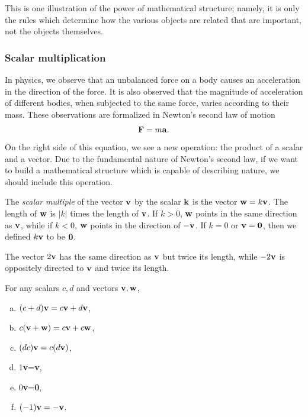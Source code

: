 \documentclass[12pt,letterpaper,reqno]{article}
\numberwithin{equation}{section}
\newcommand{\ti}[1]{\textit{#1}}
\begin{document}
This is one illustration of the power of mathematical structure; namely, it is only the rules which determine how the various objects are related that are important, not the objects themselves.

\subsubsection{Scalar multiplication}
In physics, we observe that an unbalanced force on a body causes an acceleration in the direction of the force. It is also observed that the magnitude of acceleration of different bodies, when subjected to the same force, varies according to their mass. These observations are formalized in Newton's second law of motion
\begin{equation}
	{\bf F}=m{\bf a}.
\end{equation}
On the right side of this equation, we see a new operation: the product of a scalar and a vector. Due to the fundamental nature of Newton's second law, if we want to build a mathematical structure which is capable of describing nature, we should include this operation.

\begin{defn}
The \ti{scalar multiple} of the vector ${\bf v}$ by the scalar ${\bf k}$ is the vector ${\bf w}=k{\bf v}$. The length of ${\bf w}$ is $|k|$ times the length of ${\bf v}$. If $k>0$, ${\bf w}$ points in the same direction as ${\bf v}$, while if $k<0$, ${\bf w}$ points in the direction of $-{\bf v}$. If $k=0$ or ${\bf v}={\bf 0}$, then we defined $k{\bf v}$ to be ${\bf 0}$.
\end{defn}

\begin{example}
The vector $2{\bf v}$ has the same direction as ${\bf v}$ but twice its length, while $-2{\bf v}$ is oppositely directed to ${\bf v}$ and twice its length.	
\end{example}

\begin{prop}
For any scalars $c,d$ and vectors ${\bf v}, {\bf w}$,
	\begin{enumerate}[(a)]
		\item $(c+d){\bf v}=c{\bf v}+d{\bf v}$,
		\item $c({\bf v}+{\bf w})=c{\bf v}+c{\bf w}$,
		\item $(dc){\bf v}=c(d{\bf v})$,
		\item 1{\bf v}={\bf v},
		\item 0{\bf v}={\bf 0},
		\item $(-1){\bf v}=-{\bf v}$.
	\end{enumerate}
\end{prop}
\end{document}

